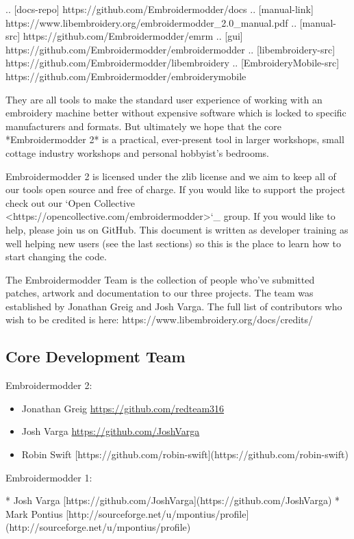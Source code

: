 .. [docs-repo] https://github.com/Embroidermodder/docs
.. [manual-link] https://www.libembroidery.org/embroidermodder_2.0_manual.pdf
.. [manual-src] https://github.com/Embroidermodder/emrm
.. [gui] https://github.com/Embroidermodder/embroidermodder
.. [libembroidery-src] https://github.com/Embroidermodder/libembroidery
.. [EmbroideryMobile-src] https://github.com/Embroidermodder/embroiderymobile

They are all tools to make the standard user experience of working with an
embroidery machine better without expensive software which is locked to specific
manufacturers and formats. But ultimately we hope that the core *Embroidermodder 2*
is a practical, ever-present tool in larger workshops, small cottage industry workshops
and personal hobbyist's bedrooms.

Embroidermodder 2 is licensed under the zlib license and we aim to keep all of
our tools open source and free of charge. If you would like to support the
project check out our `Open Collective <https://opencollective.com/embroidermodder>`_
group. If you would like to help, please
join us on GitHub. This document is written as developer training as well
helping new users (see the last sections) so this is the place to learn how
to start changing the code.

The Embroidermodder Team is the collection of people who've submitted
patches, artwork and documentation to our three projects.
The team was established by Jonathan Greig and Josh Varga.
The full list of contributors who wish to be credited is
here: https://www.libembroidery.org/docs/credits/

\subsection{Core Development Team}

Embroidermodder 2:

\begin{itemize}
\item Jonathan Greig \url{https://github.com/redteam316}
\item Josh Varga \url{https://github.com/JoshVarga}
\item Robin Swift [https://github.com/robin-swift](https://github.com/robin-swift)
\end{itemize}

Embroidermodder 1:

  * Josh Varga [https://github.com/JoshVarga](https://github.com/JoshVarga)
  * Mark Pontius [http://sourceforge.net/u/mpontius/profile](http://sourceforge.net/u/mpontius/profile)

